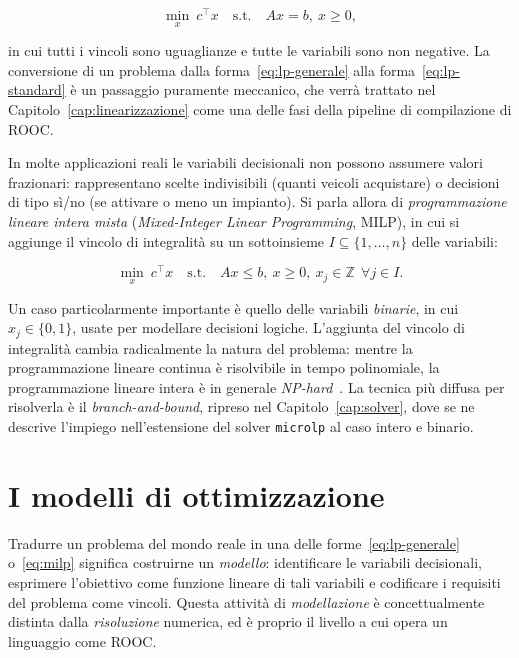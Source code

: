\begin{equation}
\label{eq:lp-standard}
\min_{x} \ c^\top x \quad \text{s.t.} \quad A x = b, \ x \ge 0,
\end{equation}

in cui tutti i vincoli sono uguaglianze e tutte le variabili sono non negative.
La conversione di un problema dalla forma~\eqref{eq:lp-generale} alla
forma~\eqref{eq:lp-standard} è un passaggio puramente meccanico, che verrà
trattato nel Capitolo~\ref{cap:linearizzazione} come una delle fasi della
pipeline di compilazione di ROOC.

In molte applicazioni reali le variabili decisionali non possono assumere valori
frazionari: rappresentano scelte indivisibili (quanti veicoli acquistare) o
decisioni di tipo sì/no (se attivare o meno un impianto). Si parla allora di
\emph{programmazione lineare intera mista} (\emph{Mixed-Integer Linear
Programming}, MILP), in cui si aggiunge il vincolo di integralità su un
sottoinsieme $I \subseteq \{1, \dots, n\}$ delle variabili:

\begin{equation}
\label{eq:milp}
\min_{x} \ c^\top x \quad \text{s.t.} \quad A x \le b, \ x \ge 0, \ x_j \in \mathbb{Z} \ \ \forall j \in I.
\end{equation}

Un caso particolarmente importante è quello delle variabili \emph{binarie}, in
cui $x_j \in \{0, 1\}$, usate per modellare decisioni logiche. L'aggiunta del
vincolo di integralità cambia radicalmente la natura del problema: mentre la
programmazione lineare continua è risolvibile in tempo polinomiale, la
programmazione lineare intera è in generale \emph{NP-hard}~\cite{wolsey1998,nemhauser1988}.
La tecnica più diffusa per risolverla è il \emph{branch-and-bound}, ripreso nel
Capitolo~\ref{cap:solver}, dove se ne descrive l'impiego nell'estensione del
solver \texttt{microlp} al caso intero e binario.

\section{I modelli di ottimizzazione}
\label{sec:modelli-ottimizzazione}

Tradurre un problema del mondo reale in una delle forme~\eqref{eq:lp-generale}
o~\eqref{eq:milp} significa costruirne un \emph{modello}: identificare le
variabili decisionali, esprimere l'obiettivo come funzione lineare di tali
variabili e codificare i requisiti del problema come vincoli. Questa attività di
\emph{modellazione} è concettualmente distinta dalla \emph{risoluzione}
numerica, ed è proprio il livello a cui opera un linguaggio come ROOC.

